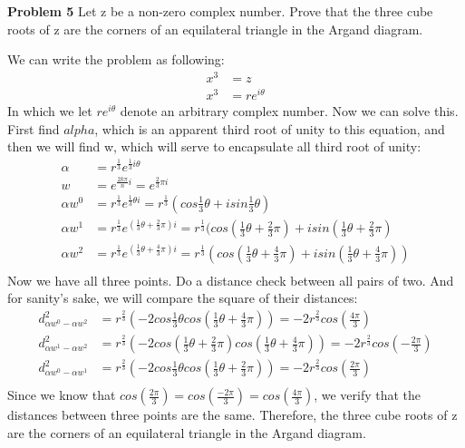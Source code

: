 \documentclass[12pt,letterpaper]{hmcpset}
\begin{document}
\begin{problem}\textbf{Problem 5}
Let z be a non-zero complex number. Prove that the three cube roots of z are the corners of an equilateral triangle in the Argand diagram.
\end{problem}

\begin{solution}
We can write the problem as following:
\begin{align*}
x^{3}	&= z	\\
x^{3}	&= re^{i\theta}
\end{align*}
In which we let $re^{i\theta}$ denote an arbitrary complex number. Now we can solve this. First find $alpha$, which is an apparent third root of unity to this equation, and then we will find w, which will serve to encapsulate all third root of unity:
\begin{align*}
\alpha &= r^{\frac{1}{3}}e^{\frac{1}{3}i\theta}	\\
w	&= e^{\frac{2k\pi}{n}i}	= e^{\frac{2}{3}\pi i}	\\
\alpha w^{0}	&= r^{\frac{1}{3}} e^{\frac{1}{3}\theta i} = r^{\frac{1}{3}}(cos\frac{1}{3}\theta + isin\frac{1}{3}\theta)	\\
\alpha w^{1}	&= r^{\frac{1}{3}} e^{(\frac{1}{3}\theta + \frac{2}{3} \pi)i} = r^{\frac{1}{3}}(cos(\frac{1}{3}\theta+\frac{2}{3}\pi) + isin(\frac{1}{3}\theta+\frac{2}{3}\pi)	\\
\alpha w^{2}	&= r^{\frac{1}{3}} e^{(\frac{1}{3}\theta + \frac{4}{3} \pi)i} = r^{\frac{1}{3}}(cos(\frac{1}{3}\theta+\frac{4}{3}\pi) + isin(\frac{1}{3}\theta+\frac{4}{3}\pi))	\\
\end{align*} Now we have all three points. Do a distance check between all pairs of two. And for sanity's sake, we will compare the square of their distances:
\begin{align*}
d^2_{\alpha w^{0}-\alpha w^{2}}	&= r^{\frac{2}{3}} (-2cos\frac{1}{3}\theta cos(\frac{1}{3}\theta+\frac{4}{3}\pi))	 = -2r^{\frac{2}{3}}cos(\frac{4\pi}{3})\\
d^2_{\alpha w^{1}-\alpha w^{2}}	&= r^{\frac{2}{3}}(-2cos(\frac{1}{3}\theta+\frac{2}{3}\pi) cos(\frac{1}{3}\theta+\frac{4}{3}\pi)) = -2r^{\frac{2}{3}}cos(-\frac{2\pi}{3})\\
d^2_{\alpha w^{0}-\alpha w^{1}}	&= r^{\frac{2}{3}}(-2cos\frac{1}{3}\theta cos(\frac{1}{3}\theta+\frac{2}{3}\pi)) = -2r^{\frac{2}{3}}cos(\frac{2\pi}{3})\\
\end{align*} Since we know that $cos(\frac{2\pi}{3})=cos(\frac{-2\pi}{3})=cos(\frac{4\pi}{3})$, we verify that the distances between three points are the same. Therefore, the three cube roots of z are the corners of an equilateral triangle in the Argand diagram.
\end{solution}
\end{document}
